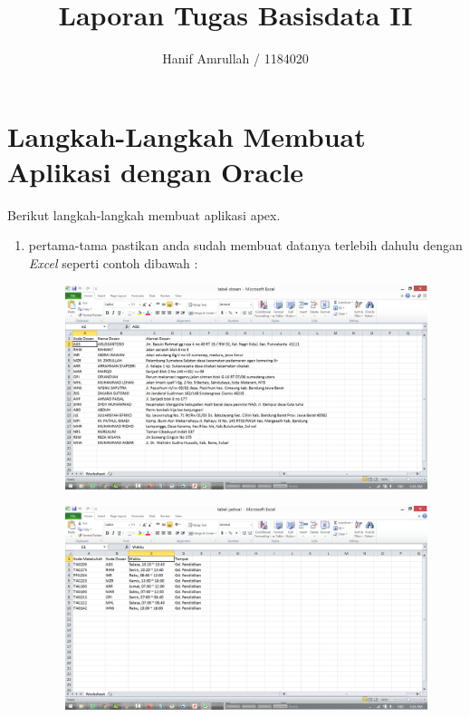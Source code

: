 \documentclass[11pt]{article}
\title{Laporan Tugas Basisdata II}
\author{Hanif Amrullah / 1184020}
\begin{document}
\maketitle

\section{Langkah-Langkah Membuat Aplikasi dengan Oracle}
Berikut langkah-langkah membuat aplikasi apex.
\begin{enumerate}

\item
pertama-tama pastikan anda sudah membuat datanya terlebih dahulu dengan \textit{Excel} seperti contoh dibawah :
\begin{figure}[h]
        \centerline{\includegraphics[scale=0.1]{img/t1.png}}
        \caption{}
        \centering
	\label{langkah1}
	\end{figure}
\begin{figure}[h]
        \centerline{\includegraphics[scale=0.1]{img/t2.png}}
        \caption{}
        \centering
	\label{langkah2}
	\end{figure}


\end{enumerate}
\end{document}

